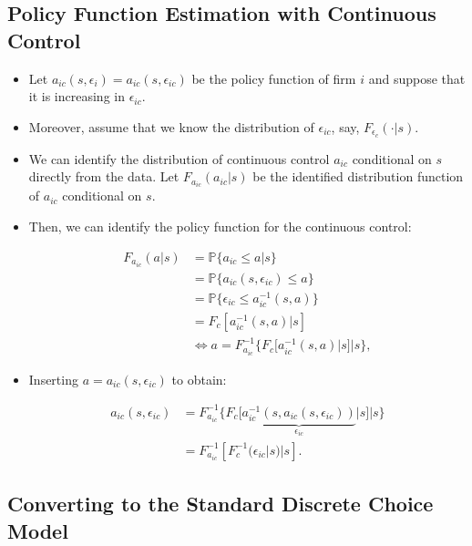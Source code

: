 \documentclass[]{book}
\providecommand{\tightlist}{%
  \setlength{\itemsep}{0pt}\setlength{\parskip}{0pt}}
\begin{document}
\subsection{Policy Function Estimation with Continuous
Control}\label{policy-function-estimation-with-continuous-control}

\begin{itemize}
\tightlist
\item
  Let \(a_{ic}(s, \epsilon_{i}) = a_{ic}(s, \epsilon_{ic})\) be the
  policy function of firm \(i\) and suppose that it is increasing in
  \(\epsilon_{ic}\).
\item
  Moreover, assume that we know the distribution of \(\epsilon_{ic}\),
  say, \(F_{\epsilon_c}(\cdot|s)\).
\item
  We can identify the distribution of continuous control \(a_{ic}\)
  conditional on \(s\) directly from the data. Let
  \(F_{a_{ic}}(a_{ic}|s)\) be the identified distribution function of
  \(a_{ic}\) conditional on \(s\).
\item
  Then, we can identify the policy function for the continuous control:

  \begin{equation}
  \begin{split}
  F_{a_{ic}}(a|s) &= \mathbb{P}\{a_{ic} \le a|s\}\\
  &= \mathbb{P}\{a_{ic}(s, \epsilon_{ic}) \le a\}\\
  &=\mathbb{P}\{\epsilon_{ic} \le a_{ic}^{-1}(s, a)\}\\
  &=F_c[a_{ic}^{-1}(s, a)|s]\\
  &\Leftrightarrow a = F_{a_{ic}}^{-1}\{F_c[a_{ic}^{-1}(s, a)|s]|s\},
  \end{split}
  \end{equation}
\item
  Inserting \(a = a_{ic}(s, \epsilon_{ic})\) to obtain:

  \begin{equation}
  \begin{split}
  a_{ic}(s, \epsilon_{ic}) &= F_{a_{ic}}^{-1}\{F_c[\underbrace{a_{ic}^{-1}(s, a_{ic}(s, \epsilon_{ic}))}_{\epsilon_{ic}}|s]|s\}\\
  & = F_{a_{ic}}^{-1}[F_c^{-1}(\epsilon_{ic}|s)|s].
  \end{split}
  \end{equation}
\end{itemize}

\subsection{Converting to the Standard Discrete Choice
Model}\label{converting-to-the-standard-discrete-choice-model}
\end{document}
